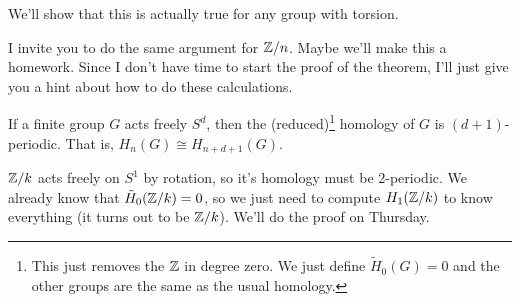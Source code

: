 \begin{remark}
 We'll show that this is actually true for any group with torsion.
\end{remark}
I invite you to do the same argument for $\mathbb{Z}/n$. Maybe we'll make this a homework. Since I don't have time to start the proof of the theorem, I'll just give you a hint about how to do these calculations.
\begin{lemma}
 If a finite group $G$ acts freely $S^d$, then the (reduced)\footnote{This just removes the $\mathbb{Z}$ in degree zero. We just define $\tilde H_0(G)=0$ and the other groups are the same as the usual homology.} homology of $G$ is $(d+1)$-periodic. That is, $H_n(G)\cong H_{n+d+1}(G)$.
\end{lemma}
\begin{example}
 $\mathbb{Z}/k$ acts freely on $S^1$ by rotation, so it's homology must be $2$-periodic. We already know that $\tilde H_0(\mathbb{Z}/k)=0$, so we just need to compute $H_1(\mathbb{Z}/k)$ to know everything (it turns out to be $\mathbb{Z}/k$). We'll do the proof on Thursday.
\end{example}









